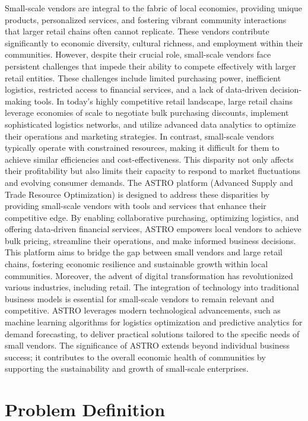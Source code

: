 Small-scale vendors are integral to the fabric of local economies, providing unique products,
personalized services, and fostering vibrant community interactions that larger retail chains
often cannot replicate. These vendors contribute significantly to economic diversity, cultural
richness, and employment within their communities. However, despite their crucial role,
small-scale vendors face persistent challenges that impede their ability to compete effectively
with larger retail entities. These challenges include limited purchasing power, inefficient logistics,
restricted access to financial services, and a lack of data-driven decision-making tools.
In today’s highly competitive retail landscape, large retail chains leverage economies of scale to
negotiate bulk purchasing discounts, implement sophisticated logistics networks, and utilize
advanced data analytics to optimize their operations and marketing strategies. In contrast,
small-scale vendors typically operate with constrained resources, making it difficult for them to
achieve similar efficiencies and cost-effectiveness. This disparity not only affects their
profitability but also limits their capacity to respond to market fluctuations and evolving
consumer demands.
The ASTRO platform (Advanced Supply and Trade Resource Optimization) is designed to
address these disparities by providing small-scale vendors with tools and services that enhance
their competitive edge. By enabling collaborative purchasing, optimizing logistics, and offering
data-driven financial services, ASTRO empowers local vendors to achieve bulk pricing,
streamline their operations, and make informed business decisions. This platform aims to bridge
the gap between small vendors and large retail chains, fostering economic resilience and
sustainable growth within local communities.
Moreover, the advent of digital transformation has revolutionized various industries, including
retail. The integration of technology into traditional business models is essential for small-scale
vendors to remain relevant and competitive. ASTRO leverages modern technological
advancements, such as machine learning algorithms for logistics optimization and predictive
analytics for demand forecasting, to deliver practical solutions tailored to the specific needs of
small vendors. The significance of ASTRO extends beyond individual business success; it
contributes to the overall economic health of communities by supporting the sustainability and
growth of small-scale enterprises.

\section{Problem Definition}

